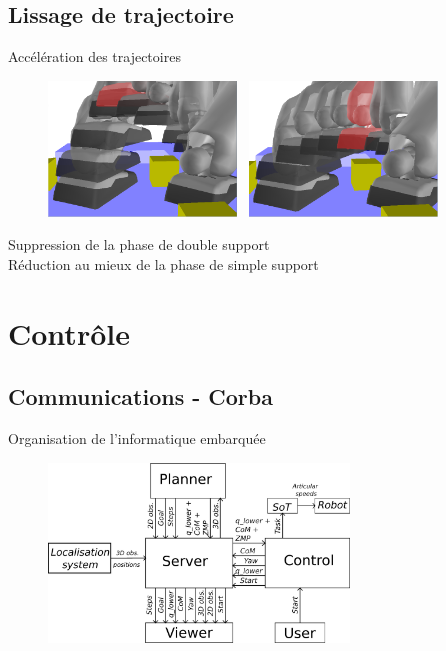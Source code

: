 \documentclass{beamer}
\begin{document}
\subsection{Lissage de trajectoire}
\begin{frame}
  \begin{center} 
    Accélération des trajectoires
    \begin{figure}
      \includegraphics[width=5cm]{./images/smoothing_before.png}~
      \includegraphics[width=5cm]{./images/smoothing_after.png}
    \end{figure}
    
    Suppression de la phase de double support\\
    Réduction au mieux de la phase de simple support
  \end{center}
\end{frame}


\section{Contrôle}
\subsection{Communications - Corba}
\begin{frame}
  \begin{center}
    Organisation de l'informatique embarquée
    \begin{figure}
      \includegraphics[width=8cm]{./images/corba.png}
    \end{figure}
  \end{center}
\end{frame}
\end{document}
